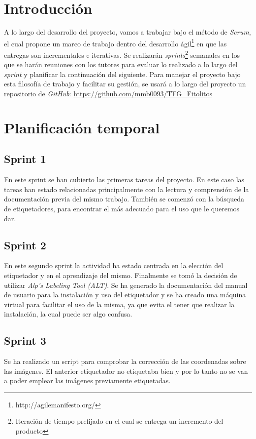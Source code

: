 
\section{Introducción}
A lo largo del desarrollo del proyecto, vamos a trabajar bajo el método de \textit{Scrum}, el cual propone un marco de trabajo dentro del desarrollo ágil\footnote{http://agilemanifesto.org/} en que las entregas son incrementales e iterativas. Se realizarán \textit{sprints}\footnote{Iteración de tiempo prefijado en el cual se entrega un incremento del producto} semanales en los que se harán reuniones con los tutores para evaluar lo realizado a lo largo del \textit{sprint} y planificar la continuación del siguiente.
Para manejar el proyecto bajo esta filosofía de trabajo y facilitar su gestión, se usará a lo largo del proyecto un repositorio de \textit{GitHub}: \url{https://github.com/mmb0093/TFG_Fitolitos}

\section{Planificación temporal}
\subsection{Sprint 1}
En este sprint se han cubierto las primeras tareas del proyecto. En este caso las tareas han estado relacionadas principalmente con la lectura y comprensión de la documentación previa del mismo trabajo.
También se comenzó con la búsqueda de etiquetadores, para encontrar el más adecuado para el uso que le queremos dar.
\subsection{Sprint 2}
En este segundo sprint la actividad ha estado centrada en la elección del etiquetador y en el aprendizaje del mismo. Finalmente se tomó la decisión de utilizar \textit{Alp’s Labeling Tool (ALT)}. 
Se ha generado la documentación del manual de usuario para la instalación y uso del etiquetador y se ha creado una máquina virtual para facilitar el uso de la misma, ya que evita el tener que realizar la instalación, la cual puede ser algo confusa.
\subsection{Sprint 3}
Se ha realizado un script para comprobar la corrección de las coordenadas sobre las imágenes. El anterior etiquetador no etiquetaba bien y por lo tanto no se van a poder emplear las imágenes previamente etiquetadas.
